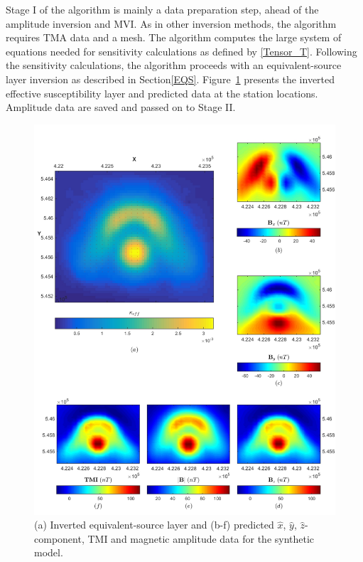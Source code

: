 Stage I of the algorithm is mainly a data preparation step, ahead of the amplitude inversion and MVI.
As in other inversion methods, the algorithm requires TMA data and a mesh.
The algorithm computes the large system of equations needed for sensitivity calculations as defined by \ref{Tensor_T}.
Following the sensitivity calculations, the algorithm proceeds with an equivalent-source layer inversion as described in Section\ref{EQS}.
Figure~\ref{fig:3D_EQS_CMI} presents the inverted effective susceptibility layer and predicted data at the station locations.
Amplitude data are saved and passed on to Stage II.
\begin{figure}[p]
\centering
\includegraphics[scale=0.55]{3D_EQS_CMI.pdf}
\caption{ (a) Inverted equivalent-source layer and (b-f) predicted $\hat x$, $\hat y$, $\hat z$-component, TMI and magnetic amplitude data for the synthetic model.}
\label{fig:3D_EQS_CMI}
\end{figure}

